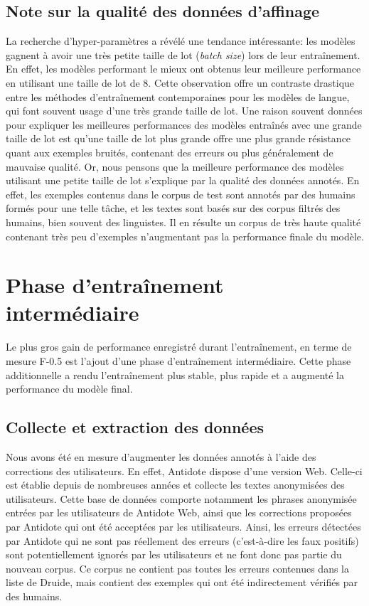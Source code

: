 \documentclass[12pt,twoside,maitrise]{dms}
\theoremstyle{definition}
\numberwithin{equation}{section}
\numberwithin{table}{chapter}
\numberwithin{figure}{chapter}
\begin{document}
\subsection{Note sur la qualité des données d'affinage}
La recherche d'hyper-paramètres a révélé une tendance intéressante: les modèles
gagnent à avoir une très petite taille de lot (\textit{batch size}) lors de
leur entraînement. En effet, les modèles performant le mieux ont obtenus leur
meilleure performance en utilisant une taille de lot de 8. Cette observation
offre un contraste drastique entre les méthodes d'entraînement contemporaines
pour les modèles de langue, qui font souvent usage d'une très grande taille de
lot. Une raison souvent données pour expliquer les meilleures performances des
modèles entraînés avec une grande taille de lot est qu'une taille de lot plus
grande offre une plus grande résistance quant aux exemples bruités, contenant
des erreurs ou plus généralement de mauvaise qualité. Or, nous pensons que la
meilleure performance des modèles utilisant une petite taille de lot s'explique
par la qualité des données annotés. En effet, les exemples contenus dans le
corpus de test sont annotés par des humains formés pour une telle tâche, et les
textes sont basés sur des corpus filtrés des humains, bien souvent des
linguistes. Il en résulte un corpus de très haute qualité contenant très peu
d'exemples n'augmentant pas la performance finale du modèle.

\section{Phase d'entraînement intermédiaire}
Le plus gros gain de performance enregistré durant l'entraînement, en terme de
mesure F-0.5 est l'ajout d'une phase d'entraînement intermédiaire. Cette phase
additionnelle a rendu l'entraînement plus stable, plus rapide et a augmenté la
performance du modèle final.

\subsection{Collecte et extraction des données}
Nous avons été en mesure d'augmenter les données annotés à l'aide des
corrections des utilisateurs. En effet, Antidote dispose d'une version Web.
Celle-ci est établie depuis de nombreuses années et collecte les textes
anonymisées des utilisateurs. Cette base de données comporte notamment les
phrases anonymisée entrées par les utilisateurs de Antidote Web, ainsi que les
corrections proposées par Antidote qui ont été acceptées par les utilisateurs.
Ainsi, les erreurs détectées par Antidote qui ne sont pas réellement des
erreurs (c'est-à-dire les faux positifs) sont potentiellement ignorés par les
utilisateurs et ne font donc pas partie du nouveau corpus. Ce corpus ne
contient pas toutes les erreurs contenues dans la liste de Druide, mais
contient des exemples qui ont été indirectement vérifiés par des humains.\\
\end{document}
